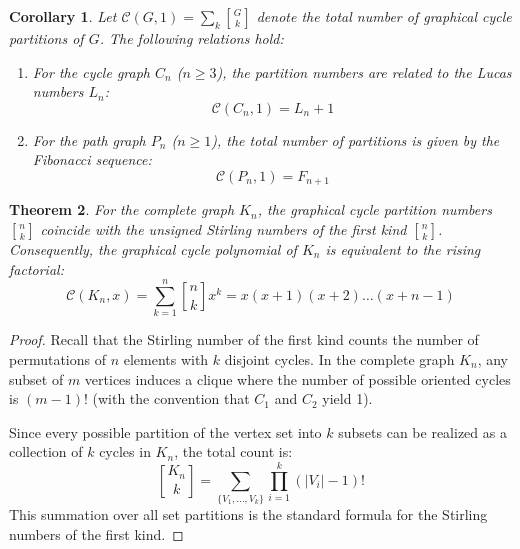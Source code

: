 \documentclass{amsart}
\newtheorem{theorem}{Theorem}[section]
\newtheorem{corollary}[theorem]{Corollary}
\theoremstyle{definition}
\begin{document}
\begin{corollary}
Let $\mathcal{C}(G, 1) = \sum_{k} {G \brack k}$ denote the total number of graphical cycle partitions of $G$. The following relations hold:
\begin{enumerate}
    \item For the cycle graph $C_n$ ($n \geq 3$), the partition numbers are related to the Lucas numbers $L_n$:
    \begin{equation*}
        \mathcal{C}(C_n, 1) = L_n + 1
    \end{equation*}
    
    \item For the path graph $P_n$ ($n \geq 1$), the total number of partitions is given by the Fibonacci sequence:
    \begin{equation*}
        \mathcal{C}(P_n, 1) = F_{n+1}
    \end{equation*}
\end{enumerate}
\end{corollary}



\begin{theorem}\label{Kn_Stirling}
For the complete graph $K_n$, the graphical cycle partition numbers ${n\brack k}$ coincide with the unsigned Stirling numbers of the first kind ${n\brack k}$. Consequently, the graphical cycle polynomial of $K_n$ is equivalent to the rising factorial:
\begin{equation*}
    \mathcal{C}(K_n, x) = \sum_{k=1}^n {n\brack k} x^k = x(x+1)(x+2)\dots(x+n-1)
\end{equation*}
\end{theorem}


\begin{proof}
Recall that the Stirling number of the first kind counts the number of permutations of $n$ elements with $k$ disjoint cycles. In the complete graph $K_n$, any subset of $m$ vertices induces a clique where the number of possible oriented cycles is $(m-1)!$ (with the convention that $C_1$ and $C_2$ yield 1). 

Since every possible partition of the vertex set into $k$ subsets can be realized as a collection of $k$ cycles in $K_n$, the total count is:
\[ {K_n \brack k} = \sum_{\{V_1, \dots, V_k\}} \prod_{i=1}^k (|V_i|-1)! \]
This summation over all set partitions is the standard formula for the Stirling numbers of the first kind.
\end{proof}
\end{document}
